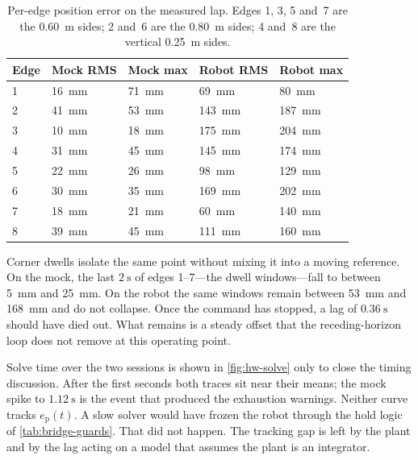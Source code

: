 \begin{table}[htbp]
  \centering
  \caption[Per-edge \ee{} position error on the measured lap]{%
    Per-edge \ee{} position error on the measured lap. Edges 1, 3, 5
    and~7 are the \qty{0.60}{\meter} sides; 2 and~6 are the
    \qty{0.80}{\meter} sides; 4 and~8 are the vertical \qty{0.25}{\meter}
    sides.}
  \label{tab:hw-segments}
  \begin{tabularx}{\linewidth}{@{}lXXXX@{}}
    \toprule
    Edge & Mock RMS & Mock max & Robot RMS & Robot max \\
    \midrule
    1 & \qty{16}{\milli\meter} & \qty{71}{\milli\meter}
      & \qty{69}{\milli\meter} & \qty{80}{\milli\meter} \\
    2 & \qty{41}{\milli\meter} & \qty{53}{\milli\meter}
      & \qty{143}{\milli\meter} & \qty{187}{\milli\meter} \\
    3 & \qty{10}{\milli\meter} & \qty{18}{\milli\meter}
      & \qty{175}{\milli\meter} & \qty{204}{\milli\meter} \\
    4 & \qty{31}{\milli\meter} & \qty{45}{\milli\meter}
      & \qty{145}{\milli\meter} & \qty{174}{\milli\meter} \\
    5 & \qty{22}{\milli\meter} & \qty{26}{\milli\meter}
      & \qty{98}{\milli\meter} & \qty{129}{\milli\meter} \\
    6 & \qty{30}{\milli\meter} & \qty{35}{\milli\meter}
      & \qty{169}{\milli\meter} & \qty{202}{\milli\meter} \\
    7 & \qty{18}{\milli\meter} & \qty{21}{\milli\meter}
      & \qty{60}{\milli\meter} & \qty{140}{\milli\meter} \\
    8 & \qty{39}{\milli\meter} & \qty{45}{\milli\meter}
      & \qty{111}{\milli\meter} & \qty{160}{\milli\meter} \\
    \bottomrule
  \end{tabularx}
\end{table}

Corner dwells isolate the same point without mixing it into a moving
reference. On the mock, the last $\qty{2}{\second}$ of edges 1--7---the
dwell windows---fall to between \qty{5}{\milli\meter} and
\qty{25}{\milli\meter}. On the robot the same windows remain between
\qty{53}{\milli\meter} and \qty{168}{\milli\meter} and do not collapse.
Once the command has stopped, a lag of $\qty{0.36}{\second}$ should
have died out. What remains is a steady offset that the receding-horizon
loop does not remove at this operating point.

Solve time over the two sessions is shown in \cref{fig:hw-solve} only to
close the timing discussion. After the first seconds both traces sit
near their means; the mock spike to $\qty{1.12}{\second}$ is the event
that produced the exhaustion warnings. Neither curve tracks
$e_{\mathrm{p}}(t)$. A slow solver would have frozen the robot through
the hold logic of \cref{tab:bridge-guards}. That did not happen. The
tracking gap is left by the plant and by the lag acting on a model that
assumes the plant is an integrator.


